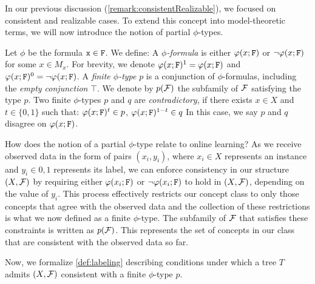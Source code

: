 In our previous discussion (\cref{remark:consistentRealizable}), we focused on consistent and realizable cases. To extend this concept into model-theoretic terms, we will now introduce the notion of partial $\phi$-types.

\begin{definition}
\begin{outline}
\0 Let $\phi$ be the formula $\texttt{x}\in \texttt{F}$. We define:
    \1 A \emph{$\phi$-formula} is either $\varphi(x;\texttt{F})$ or $\lnot\varphi(x;\texttt{F})$ for some $x\in M_x$. For brevity, we denote $\varphi(x;\texttt{F})^1=\varphi(x;\texttt{F})$ and $\varphi(x;\texttt{F})^0 = \lnot \varphi(x;\texttt{F})$.
    \1 A \emph{finite $\phi$-type} $p$ is a conjunction of $\phi$-formulas, including the \emph{empty conjunction} $\top$. We denote by $p(\mathcal{F})$ the subfamily of $\mathcal{F}$ satisfying the type $p$.
    \1 Two finite $\phi$-types $p$ and $q$ are \emph{contradictory}, if there exists $x\in X$ and $t\in\{0,1\}$ such that:
        \2 $\varphi(x;\texttt{F})^t\in p$,
        \2 $\varphi(x;\texttt{F})^{1-t}\in q$
    \1[] In this case, we say $p$ and $q$ disagree on $\varphi(x;\texttt{F})$.
\end{outline}
\end{definition}

How does the notion of a partial $\phi$-type relate to online learning? As we receive observed data in the form of pairs $(x_i, y_i)$, where $x_i \in X$ represents an instance and $y_i \in {0,1}$ represents its label, we can enforce consistency in our structure $(X, \mathcal{F})$ by requiring either $\varphi(x_i;\texttt{F})$ or $\lnot\varphi(x_i;\texttt{F})$ to hold in $(X, \mathcal{F})$, depending on the value of $y_i$. 
This process effectively restricts our concept class to only those concepts that agree with the observed data and the collection of these restrictions is what we now defined as a finite $\phi$-type. The subfamily of $\mathcal{F}$ that satisfies these constraints is written as $p(\mathcal{F})$. This represents the set of concepts in our class that are consistent with the observed data so far.

Now, we formalize \cref{def:labeling} describing conditions under which a tree $T$ admits $(X,\mathcal{F})$ consistent with a finite $\phi$-type $p$. 

